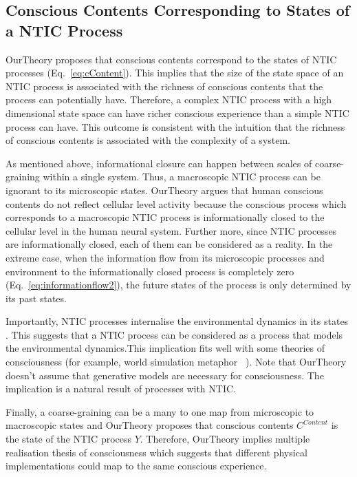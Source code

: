\documentclass[utf8]{article}
\begin{document}
    			
		\subsection{Conscious Contents Corresponding to States of a NTIC Process}\label{sec:cc}
    		\ac{OurTheory} proposes that conscious contents correspond to the states of NTIC processes (Eq.~\ref{eq:cContent}). This implies that the size of the state space of an NTIC process is associated with the richness of conscious contents that the process can potentially have. Therefore, a complex NTIC process with a high dimensional state space can have richer conscious experience than a simple NTIC process can have. This outcome is consistent with the intuition that the richness of conscious contents is associated with the complexity of a system. 
    		
    		As mentioned above, informational closure can happen between scales of coarse-graining within a single system. Thus, a macroscopic NTIC process can be ignorant to its microscopic states. \ac{OurTheory} argues that human conscious contents do not reflect cellular level activity because the conscious process which corresponds to a macroscopic NTIC process is informationally closed to the cellular level in the human neural system. Further more, since NTIC processes are informationally closed, each of them can be considered as a reality. In the extreme case, when the information flow from its microscopic processes and environment to the informationally closed process is completely zero (Eq.~\ref{eq:informationflow2}), the future states of the process is only determined by its past states. 
    		
    		Importantly, NTIC processes internalise the environmental dynamics in its states \citep[also see P.~4][]{BERTSCHINGER.2006}. This suggests that a NTIC process can be considered as a process that models the environmental dynamics.This implication fits well with some theories of consciousness (for example, world simulation metaphor ~\citep{revonsuo2006inner}). Note that \ac{OurTheory} doesn't assume that generative models are necessary for consciousness. The implication is a natural result of processes with NTIC. 
            
            Finally, a coarse-graining can be a many to one map from microscopic to macroscopic states and \ac{OurTheory} proposes that conscious contents $C^{Content}$ is the state of the NTIC process $Y$. Therefore, \ac{OurTheory} implies multiple realisation thesis of consciousness \citep{putnam1967psychological,bechtel1999multiple} which suggests that different physical implementations could map to the same conscious experience.
            
\end{document}

